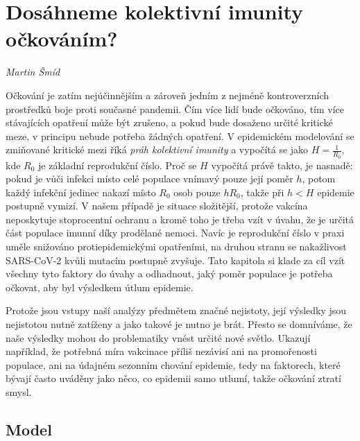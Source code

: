
\chapter{Dosáhneme kolektivní imunity očkováním?}

\textit{Martin Šmíd}
\vspace{15mm}

Očkování je zatím nejúčinnějším a zároveň jedním z nejméně kontroverzních
prostředků boje proti současné pandemii. Čím více lidí bude očkováno,
tím více stávajících opatření může být zrušeno, a pokud bude dosaženo určité kritické
meze, v principu nebude potřeba žádných opatření. V epidemickém modelování se zmiňované kritické mezi říká {\em práh kolektivní imunity} a vypočítá se jako $H=\frac{1}{R_0}$, kde $R_0$ je základní reprodukční číslo. Proč se $H$ vypočítá právě takto, je nasnadě: pokud je vůči infekci místo celé populace vnímavý pouze její poměr $h$, potom každý infekční jedinec nakazí místo $R_0$ osob pouze $h R_0$, takže při $h < H$ epidemie postupně vymizí. V našem případě je situace složitější, protože vakcína neposkytuje stoprocentní ochranu a kromě toho je třeba vzít v úvahu, že je určitá část populace imunní díky prodělané nemoci. Navíc je reprodukční číslo v praxi uměle snižováno protiepidemickými opatřeními, na druhou stranu se nakažlivost SARS-CoV-2 kvůli mutacím postupně zvyšuje. Tato kapitola si klade za cíl vzít všechny tyto faktory do úvahy a odhadnout, jaký poměr populace je potřeba očkovat, aby byl výsledkem útlum epidemie.

Protože jsou vstupy naší analýzy předmětem značné nejistoty, její výsledky jsou nejistotou nutně zatíženy a jako takové je nutno je brát. Přesto se domníváme, že naše výsledky mohou do problematiky vnést určité nové světlo. Ukazují například, že potřebná míra vakcinace příliš nezávisí
ani na promořenosti populace, ani na údajném sezonním chování epidemie,
tedy na faktorech, které bývají často uváděny jako něco, co epidemii samo utlumí, takže očkování ztratí smysl.

\section*{Model}

